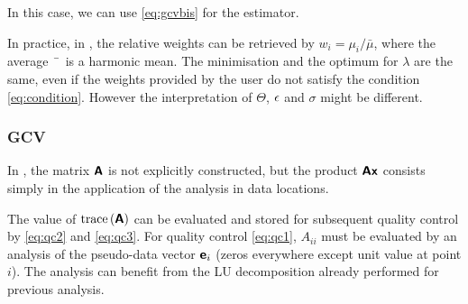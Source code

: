In this case, we can use \eqref{eq:gcvbis} for the estimator.

In practice, in \diva, the relative weights can be retrieved by $w_i=\mu_i/\bar{\mu}$, where
the average $\bar{\hphantom{\mu}}$ is a harmonic mean. The minimisation and the optimum for $\lambda$ are the same, even if the weights provided by the user do not satisfy the condition \eqref{eq:condition}. However the interpretation of $\Theta$, $\epsilon$ and $\sigma$ might be different.


\subsubsection{\diva\divaspace GCV}

In \diva, the matrix $\mbox{\boldmath $ \protect\mathsf{A} $}$ is not explicitly constructed, but the product $\mbox{\boldmath $ \protect\mathsf{A} $} \mbox{\boldmath $ \protect\mathsf{x} $}$ consists simply in the application of the analysis in data locations.

The value of $\mathrm{trace}\left( \mbox{\boldmath $ \protect\mathsf{A} $} \right)$ can be evaluated and stored for subsequent quality control by \eqref{eq:qc2} and \eqref{eq:qc3}.
For quality control \eqref{eq:qc1}, $A_{ii}$ must be evaluated by an analysis of the pseudo-data vector $\mbox{\boldmath $ \protect\mathsf{e} $}_i$ (zeros everywhere except unit value at point $i$). The analysis can benefit from the \textsf{LU} decomposition already performed for previous analysis.


